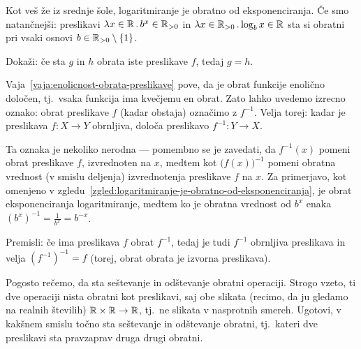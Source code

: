                 \begin{zgled}\label{zgled:logaritmiranje-je-obratno-od-eksponenciranja}
                        Kot veš že iz srednje šole, logaritmiranje je obratno od eksponenciranja. Če smo natančnejši: preslikavi $\xlam{x}[\RR]{b^x}[\RR_{> 0}]$ in $\xlam{x}[\RR_{>0}]{\log_b x}[\RR]$ sta si obratni pri vsaki osnovi $b \in \RR_{> 0} \setminus \set{1}$.
                \end{zgled}

                \begin{vaja}\label{vaja:enolicnost-obrata-preslikave}
                        Dokaži: če sta $g$ in $h$ obrata iste preslikave $f$, tedaj $g = h$.
                \end{vaja}

                Vaja~\ref{vaja:enolicnost-obrata-preslikave} pove, da je obrat funkcije enolično določen, tj.~vsaka funkcija ima kvečjemu en obrat. Zato lahko uvedemo izrecno oznako: obrat preslikave $f$ (kadar obstaja) označimo z $f^{-1}$. Velja torej: kadar je preslikava $f\colon X \to Y$ obrnljiva, določa preslikavo $f^{-1}\colon Y \to X$.

                Ta oznaka je nekoliko nerodna --- pomembno se je zavedati, da $f^{-1}(x)$ pomeni obrat preslikave $f$, izvrednoten na $x$, medtem kot $\big(f(x)\big)^{-1}$ pomeni obratna vrednost (v smislu deljenja) izvrednotenja preslikave $f$ na $x$. Za primerjavo, kot omenjeno v zgledu~\ref{zgled:logaritmiranje-je-obratno-od-eksponenciranja}, je obrat eksponenciranja logaritmiranje, medtem ko je obratna vrednost od $b^x$ enaka $(b^x)^{-1} = \frac{1}{b^x} = b^{-x}$.

                \begin{vaja}
                        Premisli: če ima preslikava $f$ obrat $f^{-1}$, tedaj je tudi $f^{-1}$ obrnljiva preslikava in velja $(f^{-1})^{-1} = f$ (torej, obrat obrata je izvorna preslikava).
                \end{vaja}

                \begin{vaja}
                        Pogosto rečemo, da sta seštevanje in odštevanje obratni operaciji. Strogo vzeto, ti dve operaciji nista obratni kot preslikavi, saj obe slikata (recimo, da ju gledamo na realnih številih) $\mathbb{R} \times \mathbb{R} \to \mathbb{R}$, tj.~ne slikata v nasprotnih smereh. Ugotovi, v kakšnem smislu točno sta seštevanje in odštevanje obratni, tj.~kateri dve preslikavi sta pravzaprav druga drugi obratni.
                \end{vaja}

